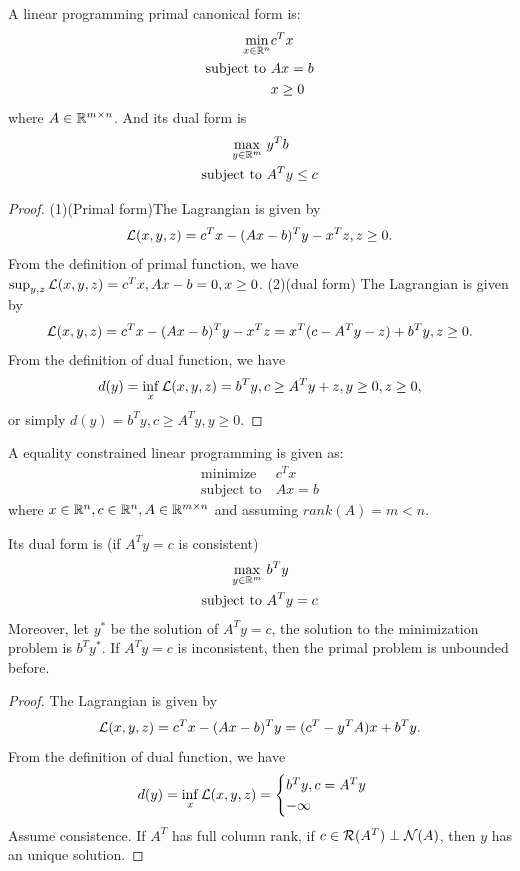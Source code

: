 \begin{refsection}
\begin{lemma}
	A linear programming primal canonical form is:
	\begin{align*}
	\min_{x\in \mathbb{R}^n}  &c^Tx\\
	\text{subject to} ~ & Ax = b\\
	& x\geq 0
	\end{align*}
	where $A\in \mathbb{R}^{m\times n}$.
	And its dual form is
	\begin{align*}
	\max_{y\in \mathbb{R}^m} ~ &y^Tb\\
	\text{subject to} ~ & A^Ty \leq c
	\end{align*}
\end{lemma}
\begin{proof}
	(1)(Primal form)The Lagrangian is given by
	$$\mathcal{L}(x,y,z) = c^Tx - (Ax-b)^Ty - x^Tz, z\geq 0.$$
	From the definition of primal function, we have $\sup_{y,z} \mathcal{L}(x,y,z) =  c^Tx, Ax - b = 0, x\geq 0$.
	(2)(dual form)  The Lagrangian is given by
	$$\mathcal{L}(x,y,z) = c^Tx - (Ax-b)^Ty - x^Tz = x^T(c - A^Ty - z) + b^Ty, z\geq 0.$$
	From the definition of dual function, we have $$d(y) = \inf_{x} \mathcal{L}(x,y,z) = b^Ty, c \geq A^Ty + z, y\geq 0, z\geq 0,$$
	or simply $d(y) =  b^Ty, c \geq A^Ty, y\geq 0$.
\end{proof}


\begin{lemma}\label{ch:linear-optimization:th:dualFormEqualityConstraint}
	A equality constrained linear programming is given as:
\begin{align*}
\text{minimize} ~ &c^Tx\\
\text{subject to} ~ & Ax=b
\end{align*}
where $x\in \mathbb{R}^n,c\in \mathbb{R}^n, A\in \mathbb{R}^{m\times n}$ and assuming $rank(A) = m<n.$

	Its dual form is (if $A^Ty = c$ is consistent)
	\begin{align*}
	\max_{y\in \mathbb{R}^m} ~ &b^Ty\\
	\text{subject to} ~ & A^Ty = c
	\end{align*}
Moreover, let $y^*$ be the solution of $A^Ty = c$, the solution to the minimization problem is $b^Ty^*$. 
If $A^Ty = c$ is inconsistent, then the primal problem is unbounded before.  
\end{lemma}
\begin{proof}
The Lagrangian is given by
	$$\mathcal{L}(x,y,z) = c^Tx - (Ax-b)^Ty= (c^T - y^TA)x + b^Ty.$$
	From the definition of dual function, we have $$d(y) = \inf_{x} \mathcal{L}(x,y,z) = 
	\begin{cases}
	b^Ty, c = A^Ty \\
	-\infty
	\end{cases}
	$$
Assume consistence. If  $A^T$ has full column rank, if $c\in \mathcal{R}(A^T) \perp \mathcal{N}(A)$, then $y$ has an unique solution. 
\end{proof}


\end{refsection}
